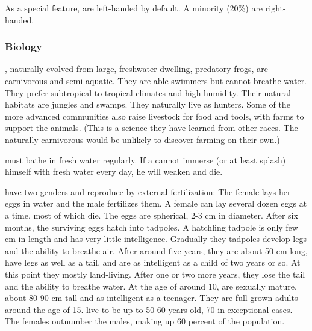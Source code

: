 As a special feature, \meccara{} are left-handed by default. A minority (20\%) are right-handed. 

\subsubsection{Biology}
\Meccara{}, naturally evolved from large, freshwater-dwelling, predatory frogs, are carnivorous and semi-aquatic. They are able swimmers but cannot breathe water. They prefer subtropical to tropical climates and high humidity. Their natural habitats are jungles and swamps. They naturally live as hunters. Some of the more advanced \meccaran{} communities also raise livestock for food and tools, with farms to support the animals. (This is a science they have learned from other races. The naturally carnivorous \meccara{} would be unlikely to discover farming on their own.) 


\Meccara{} must bathe in fresh water regularly. If a \meccaran{} cannot immerse (or at least splash) himself with fresh water every day, he will weaken and die. 

\Meccara{} have two genders and reproduce by external fertilization: The female lays her eggs in water and the male fertilizes them. A female can lay several dozen eggs at a time, most of which die. The eggs are spherical, 2-3 cm in diameter. After six months, the surviving eggs hatch into tadpoles. A hatchling tadpole is only few cm in length and has very little intelligence. Gradually they tadpoles develop legs and the ability to breathe air. After around five years, they are about 50 cm long, have legs as well as a tail, and are as intelligent as a \human{} child of two years or so. At this point they mostly land-living. After one or two more years, they lose the tail and the ability to breathe water. At the age of around 10, \meccara{} are sexually mature, about 80-90 cm tall and as intelligent as a \human{} teenager. They are full-grown adults around the age of 15. \Meccara{} live to be up to 50-60 years old, 70 in exceptional cases. The females outnumber the males, making up 60 percent of the population. 


